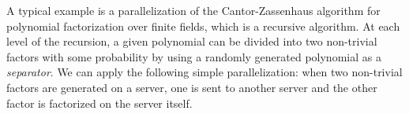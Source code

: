 %
%
%
A typical example is a parallelization of the Cantor-Zassenhaus
algorithm for polynomial factorization over finite fields,
which is a recursive algorithm.
At each level of the recursion, a given polynomial can be
divided into two non-trivial factors with some probability by using 
a randomly generated polynomial as a {\it separator}.
We can apply the following simple parallelization:
when two non-trivial factors are generated on a server,
one is sent to another server and the other factor is factorized on the server
itself. 
